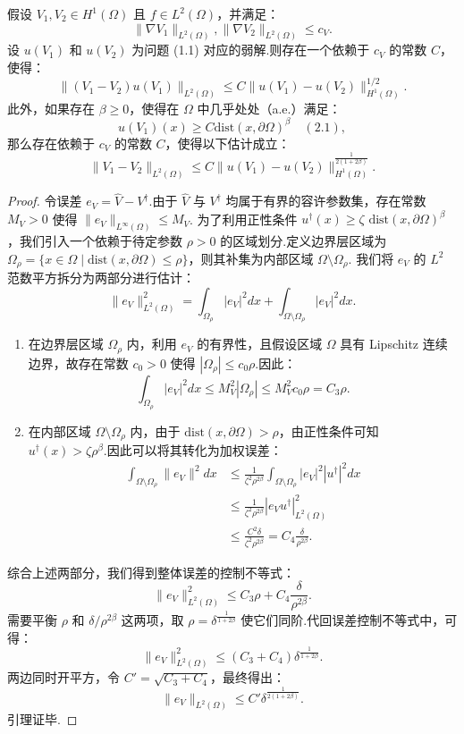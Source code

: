 \begin{lemma}\label{lem:positivity}\cite{jin2024stochastic}
假设 $V_1, V_2 \in H^1(\Omega)$ 且 $f \in L^2(\Omega)$，并满足： 
$$\| \nabla V_1 \|_{L^2(\Omega)}, \| \nabla V_2 \|_{L^2(\Omega)} \leq c_V.$$
设 $u(V_1)$ 和 $u(V_2)$ 为问题 (1.1) 对应的弱解.则存在一个依赖于 $c_V$ 的常数 $C$，使得：
$$\|(V_1 - V_2)u(V_1)\|_{L^2(\Omega)} \leq C\|u(V_1) - u(V_2)\|_{H^1(\Omega)}^{1/2}.$$
此外，如果存在 $\beta \geq 0$，使得在 $\Omega$ 中几乎处处（a.e.）满足：
$$u(V_1)(x) \geq C \text{dist}(x, \partial\Omega)^\beta \quad (2.1),$$
那么存在依赖于 $c_V$ 的常数 $C$，使得以下估计成立：
$$\|V_1 - V_2\|_{L^2(\Omega)} \leq C\|u(V_1) - u(V_2)\|_{H^1(\Omega)}^{\frac{1}{2(1+2\beta)}}.$$
\end{lemma}
\begin{proof}
令误差 $e_V = \hat{V} - V^{\dagger}$.由于 $\hat{V}$ 与 $V^{\dagger}$ 均属于有界的容许参数集，存在常数 $M_V > 0$ 使得 $\|e_V\|_{L^\infty(\Omega)} \leq M_V$.
为了利用正性条件 $u^{\dagger}(x) \geq \zeta \text{ dist}(x,\partial\Omega)^{\beta}$，我们引入一个依赖于待定参数 $\rho > 0$ 的区域划分.定义边界层区域为 $\Omega_\rho = \{x \in \Omega \mid \text{dist}(x, \partial\Omega) \leq \rho\}$，则其补集为内部区域 $\Omega \setminus \Omega_\rho$.
我们将 $e_V$ 的 $L^2$ 范数平方拆分为两部分进行估计：
$$\|e_V\|_{L^2(\Omega)}^2 = \int_{\Omega_\rho} |e_V|^2 dx + \int_{\Omega \setminus \Omega_\rho} |e_V|^2 dx.$$
\begin{enumerate}
\item 在边界层区域 $\Omega_\rho$ 内，利用 $e_V$ 的有界性，且假设区域 $\Omega$ 具有 Lipschitz 连续边界，故存在常数 $c_0 > 0$ 使得 $|\Omega_\rho| \leq c_0 \rho$.因此：
$$\int_{\Omega_\rho} |e_V|^2 dx \leq M_V^2 |\Omega_\rho| \leq M_V^2 c_0 \rho = C_3 \rho.$$
\item 在内部区域 $\Omega \setminus \Omega_\rho$ 内，由于 $\text{dist}(x, \partial\Omega) > \rho$，由正性条件可知 $u^{\dagger}(x) > \zeta \rho^\beta$.因此可以将其转化为加权误差：
$$ \begin{aligned}
\int_{\Omega \setminus \Omega_\rho} \|e_V\|^2 dx &\leq \frac{1}{\zeta^2 \rho^{2\beta}} \int_{\Omega \setminus \Omega_\rho} |e_V|^2 |u^{\dagger}|^2 dx \\
&\leq \frac{1}{\zeta^2 \rho^{2\beta}} |e_V u^{\dagger}|_{L^2(\Omega)}^2 \\
&\leq \frac{C^2 \delta}{\zeta^2 \rho^{2\beta}} = C_4 \frac{\delta}{\rho^{2\beta}}.
\end{aligned} $$
\end{enumerate}
综合上述两部分，我们得到整体误差的控制不等式：
$$\|e_V\|_{L^2(\Omega)}^2 \leq C_3 \rho + C_4 \frac{\delta}{\rho^{2\beta}}.$$
需要平衡 $\rho$ 和 $\delta / \rho^{2\beta}$ 这两项，取 $\rho = \delta^{\frac{1}{1+2\beta}}$ 使它们同阶.代回误差控制不等式中，可得：
$$\|e_V\|_{L^2(\Omega)}^2 \leq (C_3 + C_4) \delta^{\frac{1}{1+2\beta}}.$$
两边同时开平方，令 $C' = \sqrt{C_3 + C_4}$，最终得出：
$$\|e_V\|_{L^2(\Omega)} \leq C' \delta^{\frac{1}{2(1+2\beta)}}.$$
引理证毕.
\end{proof}

